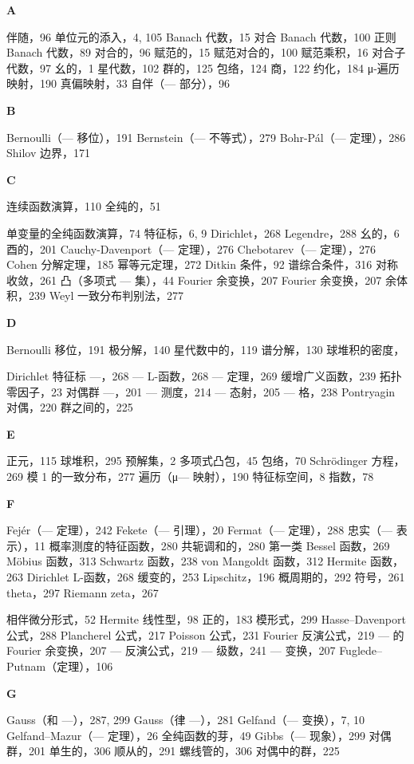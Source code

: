 
\textbf{A}

伴随，96 单位元的添入，4, 105 Banach 代数，15 对合 Banach 代数，100 正则 Banach 代数，89 对合的，96 赋范的，15 赋范对合的，100 赋范乘积，16 对合子代数，97 幺的，1 星代数，102 群的，125 包络，124 商，122 约化，184 μ-遍历映射，190 真偏映射，33 自伴（--- 部分），96

\textbf{B}

Bernoulli（--- 移位），191 Bernstein（--- 不等式），279 Bohr-Pál（--- 定理），286 Shilov 边界，171

\textbf{C}

连续函数演算，110 全纯的，51

单变量的全纯函数演算，74 特征标，6, 9 Dirichlet，268 Legendre，288 幺的，6 酉的，201 Cauchy-Davenport（--- 定理），276 Chebotarev（--- 定理），276 Cohen 分解定理，185 幂等元定理，272 Ditkin 条件，92 谱综合条件，316 对称收敛，261 凸（多项式 --- 集），44 Fourier 余变换，207 Fourier 余变换，207 余体积，239 Weyl 一致分布判别法，277

\textbf{D}

Bernoulli 移位，191 极分解，140 星代数中的，119 谱分解，130 球堆积的密度，

Dirichlet 特征标 ---，268 --- L-函数，268 --- 定理，269 缓增广义函数，239 拓扑零因子，23 对偶群 ---，201 --- 测度，214 --- 态射，205 --- 格，238 Pontryagin 对偶，220 群之间的，225

\textbf{E}

正元，115 球堆积，295 预解集，2 多项式凸包，45 包络，70 Schrödinger 方程，269 模 1 的一致分布，277 遍历（μ--- 映射），190 特征标空间，8 指数，78

\textbf{F}

Fejér（--- 定理），242 Fekete（--- 引理），20 Fermat（--- 定理），288 忠实（--- 表示），11 概率测度的特征函数，280 共轭调和的，280 第一类 Bessel 函数，269 Möbius 函数，313 Schwartz 函数，238 von Mangoldt 函数，312 Hermite 函数，263 Dirichlet L-函数，268 缓变的，253 Lipschitz，196 概周期的，292 符号，261 theta，297 Riemann zeta，267

相伴微分形式，52 Hermite 线性型，98 正的，183 模形式，299 Hasse--Davenport 公式，288 Plancherel 公式，217 Poisson 公式，231 Fourier 反演公式，219 --- 的 Fourier 余变换，207 --- 反演公式，219 --- 级数，241 --- 变换，207 Fuglede--Putnam（定理），106

\textbf{G}

Gauss（和 ---），287, 299 Gauss（律 ---），281 Gelfand（--- 变换），7, 10 Gelfand--Mazur（--- 定理），26 全纯函数的芽，49 Gibbs（--- 现象），299 对偶群，201 单生的，306 顺从的，291 螺线管的，306 对偶中的群，225

